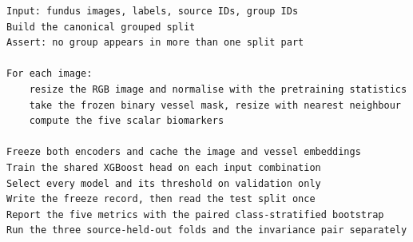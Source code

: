 \begin{lstlisting}[caption={پروتکل آموزش و ارزیابی مدل‌های اصلی}]
Input: fundus images, labels, source IDs, group IDs
Build the canonical grouped split
Assert: no group appears in more than one split part

For each image:
    resize the RGB image and normalise with the pretraining statistics
    take the frozen binary vessel mask, resize with nearest neighbour
    compute the five scalar biomarkers

Freeze both encoders and cache the image and vessel embeddings
Train the shared XGBoost head on each input combination
Select every model and its threshold on validation only
Write the freeze record, then read the test split once
Report the five metrics with the paired class-stratified bootstrap
Run the three source-held-out folds and the invariance pair separately
\end{lstlisting}
